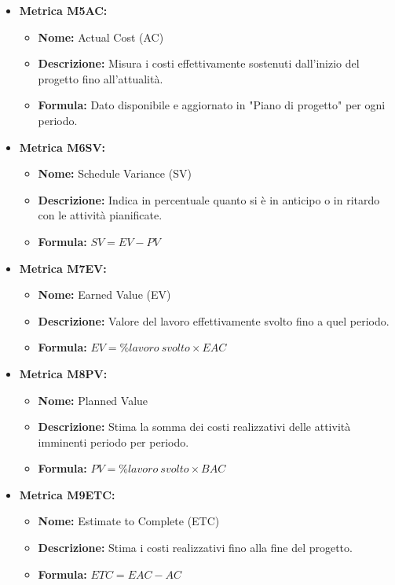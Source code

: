 \begin{itemize}
    \item \textbf{Metrica M5AC:}
          \begin{itemize}
              \item \textbf{Nome:} Actual Cost (AC)
              \item \textbf{Descrizione:} Misura i costi effettivamente sostenuti dall’inizio del progetto fino all’attualità.
              \item \textbf{Formula:} Dato disponibile e aggiornato in "Piano di progetto" per ogni periodo.
          \end{itemize}

    \item \textbf{Metrica M6SV:}
          \begin{itemize}
              \item \textbf{Nome:} Schedule Variance (SV)
              \item \textbf{Descrizione:} Indica in percentuale quanto si è in anticipo o in ritardo con le attività pianificate.
              \item \textbf{Formula:} $SV = EV - PV$
          \end{itemize}

    \item \textbf{Metrica M7EV:}
          \begin{itemize}
              \item \textbf{Nome:} Earned Value (EV)
              \item \textbf{Descrizione:} Valore del lavoro effettivamente svolto fino a quel periodo.
              \item \textbf{Formula:} $EV = \% lavoro \ svolto \times EAC$
          \end{itemize}

    \item \textbf{Metrica M8PV:}
          \begin{itemize}
              \item \textbf{Nome:} Planned Value
              \item \textbf{Descrizione:} Stima la somma dei costi realizzativi delle attività imminenti periodo per periodo.
              \item \textbf{Formula:} $PV = \% lavoro \ svolto \times BAC$
          \end{itemize}

    \item \textbf{Metrica M9ETC:}
          \begin{itemize}
              \item \textbf{Nome:} Estimate to Complete (ETC)
              \item \textbf{Descrizione:} Stima i costi realizzativi fino alla fine del progetto.
              \item \textbf{Formula:} $ETC =EAC - AC$
          \end{itemize}


\end{itemize}
